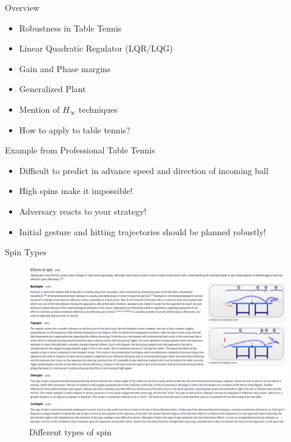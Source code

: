 \documentclass[handout]{beamer}
\begin{document}
%
\begin{frame}{Overview}
  \begin{itemize}
   \item Robustness in Table Tennis
   \item Linear Quadratic Regulator (LQR/LQG)
   \item Gain and Phase margins
   \item Generalized Plant
   \item Mention of $H_{\infty}$ techniques
   \item How to apply to table tennis?
  \end{itemize}
\end{frame}
%
\begin{frame}{Example from Professional Table Tennis}

\begin{itemize}
\item Difficult to predict in advance speed and direction of incoming ball
\item High spins make it impossible!
\item Adversary reacts to your strategy!
\item Initial gesture and hitting trajectories should be planned robustly!
\end{itemize}
\end{frame}
%
\begin{frame}{Spin Types}
\begin{figure}
\center
\includegraphics[scale=0.3]{spinTypes.jpg}			
\caption{Different types of spin~\cite{wiki}}
\end{figure}
\end{frame}
\end{document}
